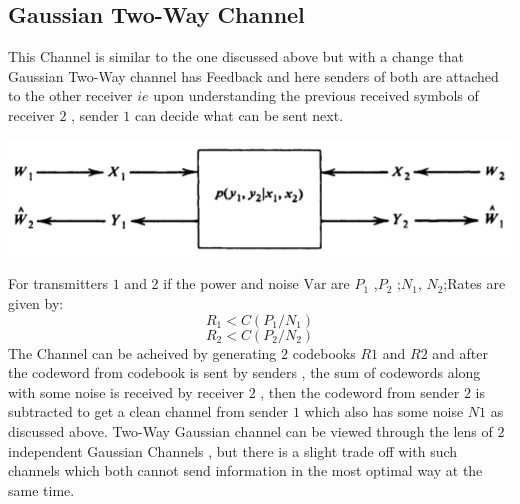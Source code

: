 \subsection{Gaussian Two-Way Channel}
This Channel is similar to the one discussed above but with a change that Gaussian Two-Way channel has Feedback and here senders of both are attached to the other receiver $ie$ upon understanding the previous received symbols of receiver $2$ , sender $1$ can decide what can be sent next.
\begin{center}
	\includegraphics[scale=0.5]{Diagrams/Gaussian_Two-Way_Channel.png}
\end{center} 
For transmitters $1$ and $2$ if the power and noise $\mathrm{Var}$ are  \( P_1 \) ,\( P_2 \) ;\( N_1 \), \( N_2 \);Rates are given by:
\begin{equation}
    R_1 < C(P_1/N_1) 
\end{equation}
\begin{equation}
    R_2 < C(P_2/N_2)
\end{equation}
The Channel can be acheived by generating $2$ codebooks $R1$ and $R2$ and after the codeword from codebook is sent by senders , the sum of codewords along with some noise is received by receiver $2$ , then the codeword from sender $2$ is subtracted to get a clean channel from sender $1$ which also has some noise $N1$ as discussed above. Two-Way Gaussian channel can be viewed through the lens of $2$ independent Gaussian Channels , but there is a slight trade off with such channels which both cannot send information in the most optimal way at the same time.